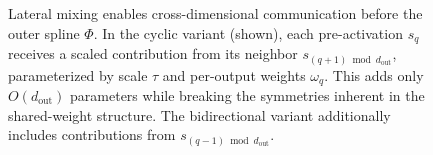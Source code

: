 \documentclass{article}
\theoremstyle{plain}
\theoremstyle{definition}
\theoremstyle{remark}
\begin{document}
\begin{figure}[ht]
    \caption{Lateral mixing enables cross-dimensional communication before the outer spline $\Phi$.
    In the cyclic variant (shown), each pre-activation $s_q$ receives a scaled contribution from its neighbor $s_{(q+1) \bmod d_{\mathrm{out}}}$, parameterized by scale $\tau$ and per-output weights $\omega_q$.
    This adds only $O(d_{\mathrm{out}})$ parameters while breaking the symmetries inherent in the shared-weight structure.
    The bidirectional variant additionally includes contributions from $s_{(q-1) \bmod d_{\mathrm{out}}}$.}
    \label{fig:lateral_mixing}
\end{figure}
\end{document}
